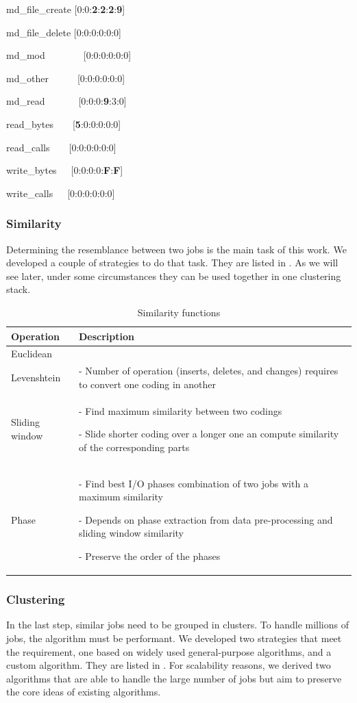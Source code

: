 \documentclass[]{llncs}
\begin{document}
md\_file\_create [0:0:\textbf{2}:\textbf{2}:\textbf{2}:\textbf{9}]

md\_file\_delete [0:0:0:0:0:0]

md\_mod\ \ \ \ \ \ \ \  [0:0:0:0:0:0]

md\_other\ \ \ \ \ \  [0:0:0:0:0:0]

md\_read\ \ \ \ \ \ \  [0:0:0:\textbf{9}:3:0]

read\_bytes\ \ \ \  [\textbf{5}:0:0:0:0:0]

read\_calls\ \ \ \  [0:0:0:0:0:0]

write\_bytes\ \ \  [0:0:0:0:\textbf{F}:\textbf{F}]

write\_calls\ \ \  [0:0:0:0:0:0]

\subsubsection{Similarity}
Determining the resemblance between two jobs is the main task of this work.
We developed a couple of strategies to do that task.
They are listed in .
As we will see later, under some circumstances they can be used together in one clustering stack.

\begin{table}
  \centering
	\begin{tabularx}{\textwidth}{lX}
    \hline
    Operation & Description \\
    \hline
    Euclidean & \\
    \hline
    Levenshtein &  - Number of operation (inserts, deletes, and changes) requires to convert one coding in another \\
    \hline
    Sliding window &  - Find maximum similarity between two codings \par - Slide shorter coding over a longer one an compute similarity of the corresponding parts \\
    \hline
    Phase &  - Find best I/O phases combination of two jobs with a maximum similarity \par - Depends on phase extraction from data pre-processing and sliding window similarity \par - Preserve the order of the phases \\
    \hline
  \end{tabularx}
  \caption{Similarity functions}
  \label{tab:sim_funcs}
\end{table}

\subsubsection{Clustering}
In the last step, similar jobs need to be grouped in clusters.
To handle millions of jobs, the algorithm must be performant.
We developed two strategies that meet the requirement, one based on widely used general-purpose algorithms, and a custom algorithm.
They are listed in .
For scalability reasons, we derived two algorithms that are able to handle the large number of jobs but aim to preserve the core ideas of existing algorithms.
\end{document}
